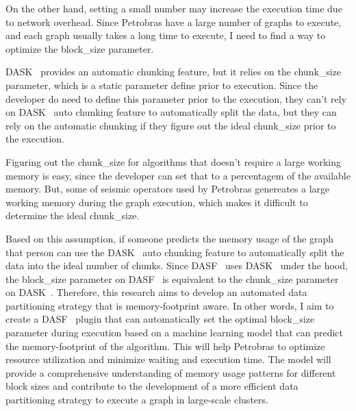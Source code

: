 On the other hand, setting a small number may increase the execution time due to network overhead.
Since Petrobras have a large number of graphs to execute, and each graph usually takes a long time to execute, I need to find a way to optimize the block\_size parameter.

DASK~\cite{dask} provides an automatic chunking feature, but it relies on the chunk\_size parameter, which is a static parameter define prior to execution.
Since the developer do need to define this parameter prior to the execution, they can't rely on DASK~\cite{dask} auto chunking feature to automatically split the data, but they can rely on the automatic chunking if they figure out the ideal chunk\_size prior to the execution.

Figuring out the chunk\_size for algorithms that doesn't require a large working memory is easy, since the developer can set that to a percentagem of the available memory.
But, some of seismic operators used by Petrobras genereates a large working memory during the graph execution, which makes it difficult to determine the ideal chunk\_size.

Based on this assumption, if someone predicts the memory usage of the graph that person can use the DASK~\cite{dask} auto chunking feature to automatically split the data into the ideal number of chunks.
Since DASF~\cite{dasf} uses DASK~\cite{dask} under the hood, the block\_size parameter on DASF~\cite{dasf} is equivalent to the chunk\_size parameter on DASK~\cite{dask}.
Therefore, this research aims to develop an automated data partitioning strategy that is memory-footprint aware.
In other words, I aim to create a DASF~\cite{dasf} plugin that can automatically set the optimal block\_size parameter during execution based on a machine learning model that can predict the memory-footprint of the algorithm.
This will help Petrobras to optimize resource utilization and minimize waiting and execution time.
The model will provide a comprehensive understanding of memory usage patterns for different block sizes and contribute to the development of a more efficient data partitioning strategy to execute a graph in large-scale clusters.
